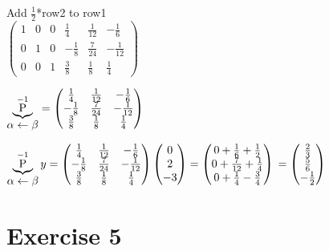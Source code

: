 \documentclass{article}
\begin{document}
Add $\frac{1}{2}$*row2 to row1\\
$
\left (
    \begin{matrix}
        1 & 0 & 0 & \frac{1}{4} & \frac{1}{12} & -\frac{1}{6}\\
        0 & 1 & 0 & -\frac{1}{8} & \frac{7}{24} & -\frac{1}{12}\\
        0 & 0 & 1 & \frac{3}{8} & \frac{1}{8} & \frac{1}{4}
    \end{matrix}
\right )
$

$\underbrace{\hbox{P}}_{\hbox{$\alpha \leftarrow \beta$}}^{-1} =
\left (
    \begin{matrix}
        \frac{1}{4} & \frac{1}{12} & -\frac{1}{6}\\
        -\frac{1}{8} & \frac{7}{24} & -\frac{1}{12}\\
        \frac{3}{8} & \frac{1}{8} & \frac{1}{4}
    \end{matrix}
\right )
$

$\underbrace{\hbox{P}}_{\hbox{$\alpha \leftarrow \beta$}}^{-1}y =
\left (
    \begin{matrix}
        \frac{1}{4} & \frac{1}{12} & -\frac{1}{6}\\
        -\frac{1}{8} & \frac{7}{24} & -\frac{1}{12}\\
        \frac{3}{8} & \frac{1}{8} & \frac{1}{4}
    \end{matrix}
\right )
\left (
    \begin{matrix}
        0\\
        2\\
        -3
    \end{matrix}
\right )
=
\left (
    \begin{matrix}
        0 + \frac{1}{6} + \frac{1}{2}\\
        0 + \frac{7}{12} + \frac{1}{4}\\
        0 + \frac{1}{4} - \frac{3}{4}
    \end{matrix}
\right ) \\
=
\left (
    \begin{matrix}
        \frac{2}{3}\\
        \frac{5}{6}\\
        -\frac{1}{2}
    \end{matrix}
\right )
$

\newpage
\section*{Exercise 5}
\end{document}
